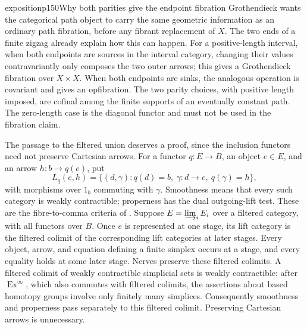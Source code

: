 \begin{dcomment}{exposition}{p150}{Why both parities give the endpoint fibration}
Grothendieck wants the categorical path object to carry the same geometric information as an ordinary path fibration, before any fibrant replacement of $X$. The two ends of a finite zigzag already explain how this can happen. For a positive-length interval, when both endpoints are sources in the interval category, changing their values contravariantly only composes the two outer arrows; this gives a Grothendieck fibration over $X\times X$. When both endpoints are sinks, the analogous operation is covariant and gives an opfibration. The two parity choices, with positive length imposed, are cofinal among the finite supports of an eventually constant path. The zero-length case is the diagonal functor and must not be used in the fibration claim.

The passage to the filtered union deserves a proof, since the inclusion functors need not preserve Cartesian arrows. For a functor $q:E\to B$, an object $e\in E$, and an arrow $h:b\to q(e)$, put
\[
 L_q(e,h)=\{(d,\gamma):q(d)=b,\ \gamma:d\to e,\ q(\gamma)=h\},
\]
with morphisms over $1_b$ commuting with $\gamma$. Smoothness means that every such category is weakly contractible; properness has the dual outgoing-lift test. These are the fibre-to-comma criteria of \citet[Theorem~1.2 and its dual]{Maltsiniotis2005Asphericite}. Suppose $E=\varinjlim_i E_i$ over a filtered category, with all functors over $B$. Once $e$ is represented at one stage, its lift category is the filtered colimit of the corresponding lift categories at later stages. Every object, arrow, and equation defining a finite simplex occurs at a stage, and every equality holds at some later stage. Nerves preserve these filtered colimits. A filtered colimit of weakly contractible simplicial sets is weakly contractible: after $\operatorname{Ex}^{\infty}$, which also commutes with filtered colimits, the assertions about based homotopy groups involve only finitely many simplices. Consequently smoothness and properness pass separately to this filtered colimit. Preserving Cartesian arrows is unnecessary.


\end{dcomment}
